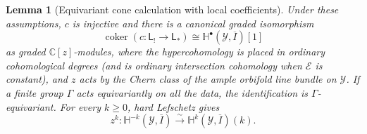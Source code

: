 \documentclass[10pt,a4paper]{amsart}
\newtheorem{lemma}[theorem]{Lemma}
\begin{document}
\begin{lemma}[Equivariant cone calculation with local coefficients]\label{lem:cone-calculation}
Under these assumptions, $c$ is injective and there is a canonical graded
isomorphism
\[
 \operatorname{coker}(c:\mathsf L_!\to\mathsf L_*)
 \cong \mathbb H^\bullet(\mathcal Y,\overline I)[1]
\]
as graded $\mathbb C[z]$-modules, where the hypercohomology is placed in
ordinary cohomological degrees (and is ordinary intersection cohomology when
$\mathcal E$ is constant), and $z$ acts
by the Chern class of the ample orbifold line bundle on $\mathcal Y$.
If a finite group $\Gamma$ acts equivariantly on all the data, the
identification is $\Gamma$-equivariant.  For every $k\geq0$, hard Lefschetz
gives
\[
 z^k:\mathbb H^{-k}(\mathcal Y,\overline I)
 \xrightarrow{\sim}
 \mathbb H^k(\mathcal Y,\overline I)(k).
\]
\end{lemma}
\end{document}
